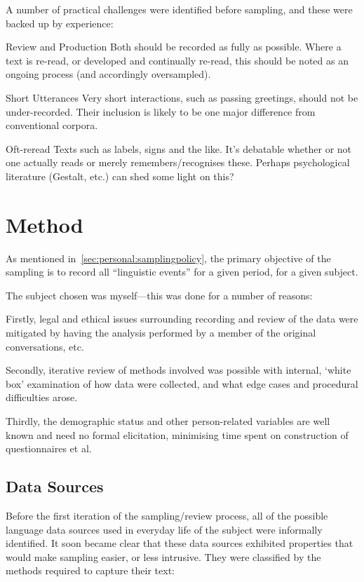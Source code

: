 A number of practical challenges were identified before sampling, and these were backed up by experience:
\begin{itemizeTitle}
    \item[Review and Production] Both should be recorded as fully as possible. Where a text is re-read, or developed and continually re-read, this should be noted as an ongoing process (and accordingly oversampled).
    \item[Short Utterances] Very short interactions, such as passing greetings, should not be under-recorded. Their inclusion is likely to be one major difference from conventional corpora.
    \item[Oft-reread Texts] such as labels, signs and the like. It’s debatable whether or not one actually reads or merely remembers/recognises these. Perhaps psychological literature (Gestalt, etc.) can shed some light on this?
\end{itemizeTitle}










\section{Method}
As mentioned in~\ref{sec:personal:samplingpolicy}, the primary objective of the sampling is to record all ``linguistic events'' for a given period, for a given subject.

The subject chosen was myself---this was done for a number of reasons:

Firstly, legal and ethical issues surrounding recording and review of the data were mitigated by having the analysis performed by a member of the original conversations, etc.

Secondly, iterative review of methods involved was possible with internal, `white box' examination of how data were collected, and what edge cases and procedural difficulties arose.

Thirdly, the demographic status and other person-related variables are well known and need no formal elicitation, minimising time spent on construction of questionnaires et al.


\subsection{Data Sources}
Before the first iteration of the sampling/review process, all of the possible language data sources used in everyday life of the subject were informally identified.  It soon became clear that these data sources exhibited properties that would make sampling easier, or less intrusive.  They were classified by the methods required to capture their text:

